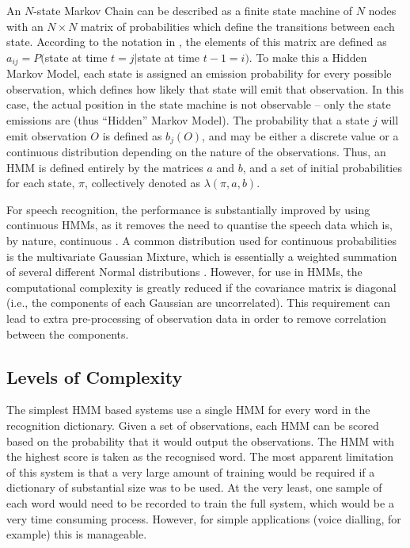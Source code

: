 	An $N$-state Markov Chain can be described as a finite state machine of $N$ nodes with an $N{\times}N$ matrix of probabilities which define the transitions between each state.  According to the notation in \cite{rabiner1989tutorial}, the elements of this matrix are defined as $a_{ij} = P($state at time $t = j |$state at time $t-1 = i)$.  To make this a Hidden Markov Model, each state is assigned an emission probability for every possible observation, which defines how likely that state will emit that observation.  In this case, the actual position in the state machine is not observable -- only the state emissions are (thus ``Hidden'' Markov Model).  The probability that a state $j$ will emit observation $O$ is defined as $b_j(O)$, and may be either a discrete value or a continuous distribution depending on the nature of the observations.  Thus, an HMM is defined entirely by the matrices $a$ and $b$, and a set of initial probabilities for each state, $\pi$, collectively denoted as $\lambda(\pi,a,b)$.

	For speech recognition, the performance is substantially improved by using continuous HMMs, as it removes the need to quantise the speech data which is, by nature, continuous \cite{matsui1992comparison}.  A common  distribution used for continuous probabilities is the multivariate Gaussian Mixture, which is essentially a weighted summation of several different Normal distributions \cite{bilmes2006hmms}.  However, for use in HMMs, the computational complexity is greatly reduced if the covariance matrix is diagonal (i.e., the components of each Gaussian are uncorrelated).  This requirement can lead to extra pre-processing of observation data in order to remove correlation between the components.

	\subsection{Levels of Complexity} %
	\label{sub:levels_of_complexity}
		The simplest HMM based systems use a single HMM for every word in the recognition dictionary.  Given a set of observations, each HMM can be scored based on the probability that it would output the observations.  The HMM with the highest score is taken as the recognised word.  The most apparent limitation of this system is that a very large amount of training would be required if a dictionary of substantial size was to be used.  At the very least, one sample of each word would need to be recorded to train the full system, which would be a very time consuming process.  However, for simple applications (voice dialling, for example) this is manageable.

